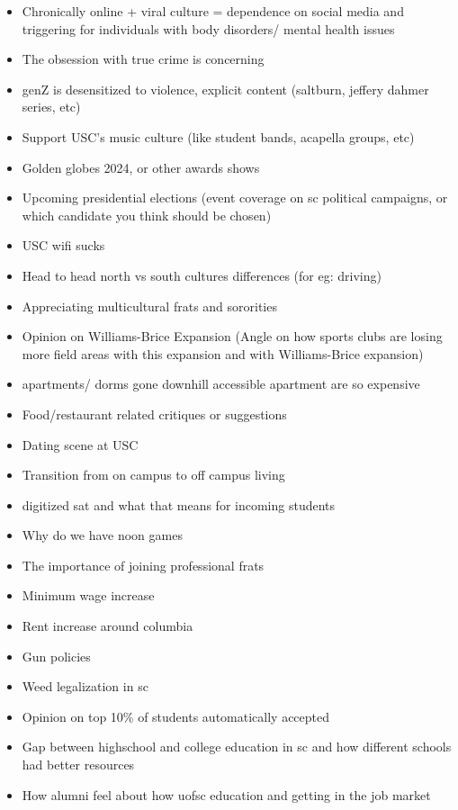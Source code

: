 \documentclass{article}
\begin{document}
\begin{itemize}
\item
  Chronically online + viral culture = dependence on social media and
  triggering for individuals with body disorders/ mental health issues
\item
  The obsession with true crime is concerning
\item
  genZ is desensitized to violence, explicit content (saltburn, jeffery
  dahmer series, etc)
\item
  Support USC's music culture (like student bands, acapella groups, etc)
\item
  Golden globes 2024, or other awards shows
\item
  Upcoming presidential elections (event coverage on sc political
  campaigns, or which candidate you think should be chosen)
\item
  USC wifi sucks~
\item
  Head to head north vs south cultures differences (for eg: driving)
\item
  Appreciating multicultural frats and sororities~
\item
  Opinion on Williams-Brice Expansion (Angle on how sports clubs are
  losing more field areas with this expansion and with Williams-Brice
  expansion)~
\item
  apartments/ dorms gone downhill accessible apartment are so expensive
\item
  Food/restaurant related critiques or suggestions
\item
  Dating scene at USC~
\item
  Transition from on campus to off campus living
\item
  digitized sat and what that means for incoming students~
\item
  Why do we have noon games
\item
  The importance of joining professional frats
\item
  Minimum wage increase
\item
  Rent increase around columbia
\item
  Gun policies
\item
  Weed legalization in sc
\item
  Opinion on top 10\% of students automatically accepted
\item
  Gap between highschool and college education in sc and how different
  schools had better resources
\item
  How alumni feel about how uofsc education and getting in the job
  market~
\end{itemize}
\end{document}
